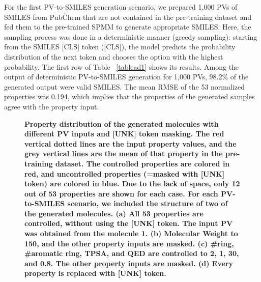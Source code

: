 \documentclass{nature_meth}
\newcommand{\1}{\blmath{1}}
\newcommand{\0}{\blmath{0}}
\begin{document}
For the first PV-to-SMILES generation scenario, we prepared 1,000 PVs of SMILES from PubChem\cite{kim2021pubchem} that are not contained in the pre-training dataset and fed them to the pre-trained SPMM to generate appropriate SMILES. Here, the sampling process was done in a deterministic manner (greedy sampling): starting from the SMILES [CLS] token ([CLS]), the model predicts the probability distribution of the next token and chooses the option with the highest probability. The first row of Table ~\ref{tablead1} shows its results. Among the output of deterministic PV-to-SMILES generation for 1,000 PVs, 98.2\% of the generated output were valid SMILES. The mean RMSE of the 53 normalized properties was 0.194, which implies that the properties of the generated samples agree with the property input.

\begin{figure}[!hbt]
	\centering
 \centerline{}
	\caption{\bf\footnotesize 
Property distribution of the generated molecules with different PV inputs and [UNK] token masking. The red vertical dotted lines are the input property values, and the grey vertical lines are the mean of that property in the pre-training dataset. The controlled properties are colored in red, and uncontrolled properties (=masked with [UNK] token) are colored in blue. Due to the lack of space, only 12 out of 53 properties are shown for each case. For each PV-to-SMILES scenario, we included the structure of two of the generated molecules. (a) All 53 properties are controlled, without using the [UNK] token. The input PV was obtained from the molecule \textbf{1}. (b) Molecular Weight to 150, and the other property inputs are masked. (c) \#ring, \#aromatic ring, TPSA, and QED are controlled to 2, 1, 30, and 0.8. The other property inputs are masked. (d) Every property is replaced with [UNK] token.
}
	\label{fig4}
\end{figure}
\end{document}
